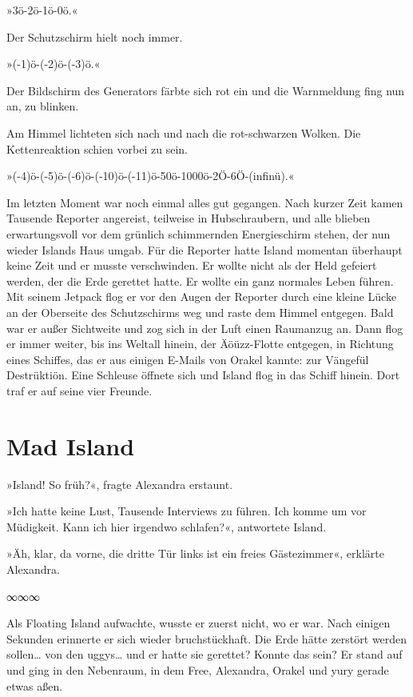 »3ö-2ö-1ö-0ö.«

Der Schutzschirm hielt noch immer.

»(-1)ö-(-2)ö-(-3)ö.«

Der Bildschirm des Generators färbte sich rot ein und die Warnmeldung fing nun an, zu blinken.

Am Himmel lichteten sich nach und nach die rot-schwarzen Wolken. Die Kettenreaktion schien vorbei zu sein.

»(-4)ö-(-5)ö-(-6)ö-(-10)ö-(-11)ö-50ö-1000ö-2Ö-6Ö-(infinü).«

Im letzten Moment war noch einmal alles gut gegangen. Nach kurzer Zeit kamen Tausende Reporter angereist, teilweise in Hubschraubern, und alle blieben erwartungsvoll vor dem grünlich schimmernden Energieschirm stehen, der nun wieder Islands Haus umgab. Für die Reporter hatte Island momentan überhaupt keine Zeit und er musste verschwinden. Er wollte nicht als der Held gefeiert werden, der die Erde gerettet hatte. Er wollte ein ganz normales Leben führen. Mit seinem Jetpack flog er vor den Augen der Reporter durch eine kleine Lücke an der Oberseite des Schutzschirms weg und raste dem Himmel entgegen. Bald war er außer Sichtweite und zog sich in der Luft einen Raumanzug an. Dann flog er immer weiter, bis ins Weltall hinein, der Äöüzz-Flotte entgegen, in Richtung eines Schiffes, das er aus einigen E-Mails von Orakel kannte: zur Vängefül Destrüktiön. Eine Schleuse öffnete sich und Island flog in das Schiff hinein. Dort traf er auf seine vier Freunde.


\chapter{Mad Island}

»Island! So früh?«, fragte Alexandra erstaunt.

»Ich hatte keine Lust, Tausende Interviews zu führen. Ich komme um vor Müdigkeit. Kann ich hier irgendwo schlafen?«, antwortete Island.

»Äh, klar, da vorne, die dritte Tür links ist ein freies Gästezimmer«, erklärte Alexandra.

\begin{center}
    ∞∞∞
\end{center}

Als Floating Island aufwachte, wusste er zuerst nicht, wo er war. Nach einigen Sekunden erinnerte er sich wieder bruchstückhaft. Die Erde hätte zerstört werden sollen… von den uggys… und er hatte sie gerettet? Konnte das sein? Er stand auf und ging in den Nebenraum, in dem Free, Alexandra, Orakel und yury gerade etwas aßen.

